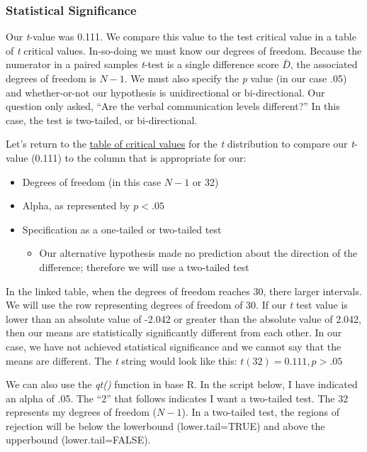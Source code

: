 \documentclass[
  11pt,
]{book}
\providecommand{\tightlist}{%
  \setlength{\itemsep}{0pt}\setlength{\parskip}{0pt}}
\begin{document}
\hypertarget{statistical-significance-2}{%
\subsubsection{Statistical Significance}\label{statistical-significance-2}}

Our \emph{t}-value was 0.111. We compare this value to the test critical value in a table of \emph{t} critical values. In-so-doing we must know our degrees of freedom. Because the numerator in a paired samples \emph{t}-test is a single difference score \(\bar{D}\), the associated degrees of freedom is \(N-1\). We must also specify the \emph{p} value (in our case .05) and whether-or-not our hypothesis is unidirectional or bi-directional. Our question only asked, ``Are the verbal communication levels different?'' In this case, the test is two-tailed, or bi-directional.

Let's return to the \href{https://www.statology.org/t-distribution-table/}{table of critical values} for the \emph{t} distribution to compare our \emph{t}-value (0.111) to the column that is appropriate for our:

\begin{itemize}
\tightlist
\item
  Degrees of freedom (in this case \(N-1\) or 32)
\item
  Alpha, as represented by \(p < .05\)
\item
  Specification as a one-tailed or two-tailed test

  \begin{itemize}
  \tightlist
  \item
    Our alternative hypothesis made no prediction about the direction of the difference; therefore we will use a two-tailed test
  \end{itemize}
\end{itemize}

In the linked table, when the degrees of freedom reaches 30, there larger intervals. We will use the row representing degrees of freedom of 30. If our \emph{t} test value is lower than an absolute value of -2.042 or greater than the absolute value of 2.042, then our means are statistically significantly different from each other. In our case, we have not achieved statistical significance and we cannot say that the means are different. The \emph{t} string would look like this: \(t(32) = 0.111, p > .05\)

We can also use the \emph{qt()} function in base R. In the script below, I have indicated an alpha of .05. The ``2'' that follows indicates I want a two-tailed test. The 32 represents my degrees of freedom (\(N-1\)). In a two-tailed test, the regions of rejection will be below the lowerbound (lower.tail=TRUE) and above the upperbound (lower.tail=FALSE).
\end{document}
